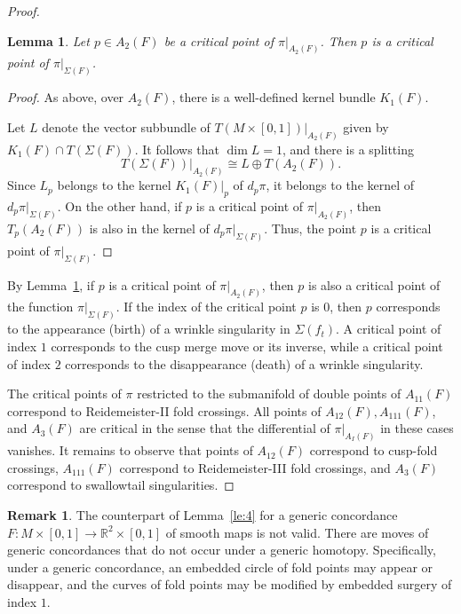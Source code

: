 \documentclass[12pt]{amsart}
\def \R{\mathbb{R}}
\def\co{\colon}
\newtheorem{lemma}[theorem]{Lemma}
\theoremstyle{definition}
\newtheorem{remark}[theorem]{Remark}
\begin{document}
\begin{proof}
\begin{lemma}\label{le:5} Let $p\in A_2(F)$ be a critical point of $\pi|_{A_2(F)}$. Then $p$ is a critical point of $\pi|_{\Sigma(F)}$. 
\end{lemma}
\begin{proof}  As above, over $A_2(F)$, there is a well-defined kernel bundle $K_1(F)$. 

Let $L$ denote the vector subbundle of $T(M\times [0,1])|_{A_2(F)}$ given by $K_1(F)\cap T(\Sigma(F))$. It follows that $\dim L=1$, and there is a splitting
\[
     T(\Sigma(F))|_{A_2(F)} \cong L \oplus T(A_2(F)). 
\]
Since $L_p$ belongs to the kernel $K_1(F)|_p$ of $d_p\pi$, it belongs to the kernel of $d_p\pi|_{\Sigma(F)}$.
On the other hand, if $p$ is a critical point of $\pi|_{A_2(F)}$, then $T_p(A_2(F))$ is also in the kernel of $d_p\pi|_{\Sigma(F)}$. Thus, the point $p$ is a critical point of $\pi|_{\Sigma(F)}$. 
\end{proof}

By Lemma~\ref{le:5}, if $p$ is a critical point of $\pi|_{A_2(F)}$, then $p$ is also a critical point of the function $\pi|_{\Sigma(F)}$. If the index of the critical point $p$ is $0$, then $p$ corresponds to the appearance (birth) of a wrinkle singularity in $\Sigma(f_t)$. A critical point of index $1$ corresponds to the cusp merge move or its inverse, while a critical point of index $2$ corresponds to the disappearance (death) of a wrinkle singularity. 

The critical points of $\pi$ restricted to the submanifold of double points of $A_{11}(F)$ correspond to Reidemeister-II fold crossings. All points of $A_{12}(F), A_{111}(F)$,  and $A_{3}(F)$ are critical in the sense that the differential of $\pi|_{A_I(F)}$ in these cases vanishes. 
It remains to observe that points of $A_{12}(F)$ correspond to cusp-fold crossings,  $A_{111}(F)$ correspond to  Reidemeister-III fold crossings, and $A_3(F)$ correspond to swallowtail singularities.  
\end{proof}

\begin{remark}  
 The counterpart of Lemma~\ref{le:4} for a generic concordance $F\co M\times [0,1]\to \R^2\times [0,1]$ of smooth maps is not valid. There are moves of generic concordances that do not occur under a generic homotopy. Specifically, under a generic concordance,  an embedded circle of fold points may appear or disappear,  and the curves of fold points may be modified by embedded surgery of index $1$. 
\end{remark}
\end{document}
